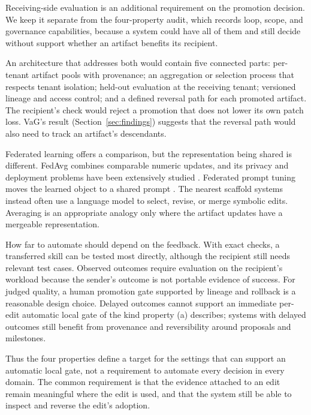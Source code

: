 Receiving-side evaluation is an additional requirement on the promotion decision. We keep it separate from the four-property audit, which records loop, scope, and governance capabilities, because a system could have all of them and still decide without support whether an artifact benefits its recipient.

An architecture that addresses both would contain five connected parts: per-tenant artifact pools with provenance; an aggregation or selection process that respects tenant isolation; held-out evaluation at the receiving tenant; versioned lineage and access control; and a defined reversal path for each promoted artifact. The recipient's check would reject a promotion that does not lower its own patch loss. VaG's result (Section~\ref{sec:findings}) suggests that the reversal path would also need to track an artifact's descendants.

Federated learning offers a comparison, but the representation being shared is different. FedAvg combines comparable numeric updates, and its privacy and deployment problems have been extensively studied \cite{mcmahan2017fedavg, mcmahan2018dpfedavg, kairouz2021federated}. Federated prompt tuning moves the learned object to a shared prompt \cite{guo2022promptfl}. The nearest scaffold systems instead often use a language model to select, revise, or merge symbolic edits. Averaging is an appropriate analogy only where the artifact updates have a mergeable representation.

How far to automate should depend on the feedback. With exact checks, a transferred skill can be tested most directly, although the recipient still needs relevant test cases. Observed outcomes require evaluation on the recipient's workload because the sender's outcome is not portable evidence of success. For judged quality, a human promotion gate supported by lineage and rollback is a reasonable design choice. Delayed outcomes cannot support an immediate per-edit automatic local gate of the kind property (a) describes; systems with delayed outcomes still benefit from provenance and reversibility around proposals and milestones.

Thus the four properties define a target for the settings that can support an automatic local gate, not a requirement to automate every decision in every domain. The common requirement is that the evidence attached to an edit remain meaningful where the edit is used, and that the system still be able to inspect and reverse the edit's adoption.

